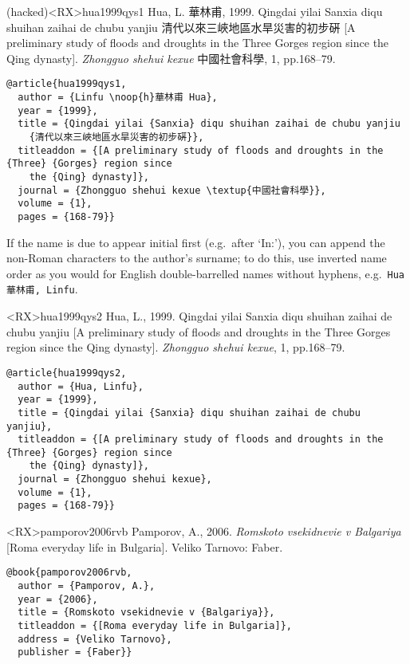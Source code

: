 \documentclass[10pt,a4paper]{article}
\newenvironment{tips}{%
  \begin{list}{\makebox[2em][c]{\faLightbulbO}}{%
    \setlength{\leftmargin}{2em}
    \setlength{\labelwidth}{2em}
    \setlength{\labelsep}{0pt}}
}{\end{list}}
\begin{document}
\newcommand*{\noop}[1]{}
\begin{bibexbox}(hacked)<RX>{hua1999qys1}
  Hua, L. 華林甫, 1999.  Qingdai yilai Sanxia diqu shuihan zaihai de chubu yanjiu 清代以來三峽地區水旱災害的初步硏 [A preliminary study of floods and droughts in the Three Gorges region since the Qing dynasty]. \emph{Zhongguo shehui kexue} 中國社會科學, 1, pp.168--79.
  \tcblower
\begin{Verbatim}
@article{hua1999qys1,
  author = {Linfu \noop{h}華林甫 Hua},
  year = {1999},
  title = {Qingdai yilai {Sanxia} diqu shuihan zaihai de chubu yanjiu
    {清代以來三峽地區水旱災害的初步硏}},
  titleaddon = {[A preliminary study of floods and droughts in the {Three} {Gorges} region since
    the {Qing} dynasty]},
  journal = {Zhongguo shehui kexue \textup{中國社會科學}},
  volume = {1},
  pages = {168-79}}
\end{Verbatim}
\end{bibexbox}

\begin{tips}
\item If the name is due to appear initial first (e.g.\ after `In:'), you can append the non-Roman characters to the author's surname; to do this, use inverted name order as you would for English double-barrelled names without hyphens, e.g.\ \texttt{Hua 華林甫, Linfu}.
\end{tips}

\begin{bibexbox}<RX>{hua1999qys2}
  Hua, L., 1999. Qingdai yilai Sanxia diqu shuihan zaihai de chubu yanjiu [A preliminary study of floods and droughts in the Three Gorges region since the Qing dynasty]. \emph{Zhongguo shehui kexue}, 1, pp.168--79.
  \tcblower
\begin{Verbatim}
@article{hua1999qys2,
  author = {Hua, Linfu},
  year = {1999},
  title = {Qingdai yilai {Sanxia} diqu shuihan zaihai de chubu yanjiu},
  titleaddon = {[A preliminary study of floods and droughts in the {Three} {Gorges} region since
    the {Qing} dynasty]},
  journal = {Zhongguo shehui kexue},
  volume = {1},
  pages = {168-79}}
\end{Verbatim}
\end{bibexbox}

\begin{bibexbox}<RX>{pamporov2006rvb}
  Pamporov, A., 2006. \emph{Romskoto vsekidnevie v Balgariya} [Roma everyday life in Bulgaria]. Veliko Tarnovo: Faber.
  \tcblower
\begin{Verbatim}
@book{pamporov2006rvb,
  author = {Pamporov, A.},
  year = {2006},
  title = {Romskoto vsekidnevie v {Balgariya}},
  titleaddon = {[Roma everyday life in Bulgaria]},
  address = {Veliko Tarnovo},
  publisher = {Faber}}
\end{Verbatim}
\end{bibexbox}
\end{document}
